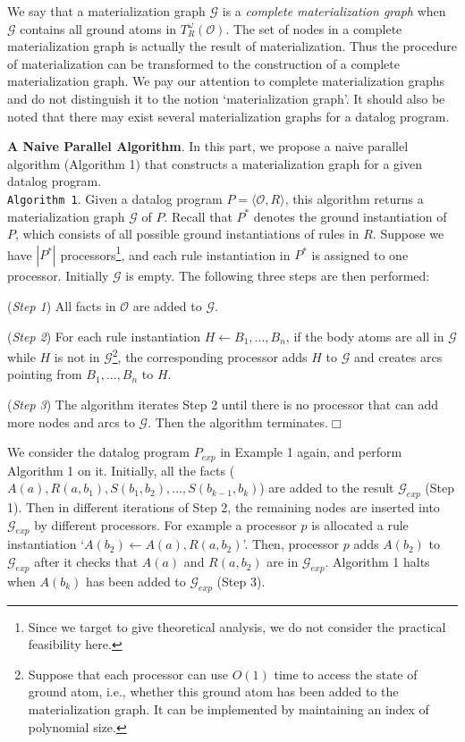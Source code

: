 \documentclass{article}
\begin{document}
We say that a materialization graph $\mathcal{G}$ is a \emph{complete materialization graph} when $\mathcal{G}$ contains all ground atoms in $T_R^{\omega}(\mathcal{O})$. The set of nodes in a complete materialization graph is actually the result of materialization. Thus the procedure of materialization
can be transformed to the construction of a complete materialization graph. We pay our attention to complete materialization graphs and do not distinguish it to the notion `materialization graph'. It should also be noted that there may exist several materialization graphs for a datalog program.

\textbf{A Naive Parallel Algorithm}. In this part, we propose a naive parallel algorithm (Algorithm 1) that constructs a materialization graph for a given datalog program.\\

\noindent\texttt{Algorithm 1}. Given a datalog program $P=\langle\mathcal{O}, R\rangle$, this algorithm
returns a materialization graph $\mathcal{G}$ of $P$. Recall that $P^*$ denotes the ground instantiation of $P$,
which consists of all possible ground instantiations of rules in $R$. Suppose we have
$|P^*|$ processors\footnote{Since we target to give theoretical analysis, we do not consider the practical feasibility here.}, and each rule instantiation in $P^*$ is assigned to one processor.
Initially $\mathcal{G}$ is empty. The following three steps are then performed:

(\emph{Step 1}) All facts in $\mathcal{O}$ are added to $\mathcal{G}$.

(\emph{Step 2}) For each rule instantiation $H\leftarrow B_1,...,B_n$, if the body atoms are all in $\mathcal{G}$ while $H$ is not in $\mathcal{G}$\footnote{Suppose that each processor can use $O(1)$ time to access the state of ground atom, i.e., whether this ground atom has been added to the materialization graph. It can be implemented by maintaining an
index of polynomial size.},
the corresponding processor adds $H$ to $\mathcal{G}$ and creates arcs pointing from $B_1,...,B_n$ to $H$.

(\emph{Step 3}) The algorithm iterates Step 2 until there is no processor that can add more nodes and arcs to $\mathcal{G}$.
Then the algorithm terminates.\hfill$\Box$\\

\begin{example}
We consider the datalog program $P_{exp}$ in Example 1 again, and perform Algorithm 1 on it. Initially, all the facts
($A(a),R(a,b_1),S(b_1,b_2),...,S(b_{k-1},b_{k})$) are added to the result $\mathcal{G}_{exp}$ (Step 1). Then in different iterations of Step 2, the remaining nodes are inserted into
$\mathcal{G}_{exp}$ by different processors. For example a processor $p$ is allocated a rule instantiation `$A(b_2)\leftarrow A(a),R(a,b_2)$'. Then, processor $p$ adds $A(b_2)$ to $\mathcal{G}_{exp}$ after it checks that $A(a)$ and $R(a,b_2)$ are in $\mathcal{G}_{exp}$. Algorithm 1 halts when $A(b_k)$ has been added to $\mathcal{G}_{exp}$ (Step 3).
\end{example}
\end{document}
